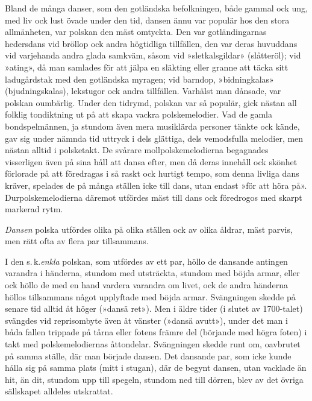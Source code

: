 \pagestyle{empty}
\fancyhfoffset[E,O]{0pt}
\addtolength{\skip\footins}{\baselineskip}
{
\setlength{\parindent}{1.5em}


Bland de många danser, som den gotländska befolkningen,
både gammal ock ung, med liv ock lust övade under den
tid, dansen ännu var populär hos den stora allmänheten, var
polskan den mäst omtyckta. Den var gotländingarnas hedersdans vid bröllop ock andra högtidliga tillfällen, den var deras huvuddans vid varjehanda andra glada samkväm, såsom vid »sletkalsgildar» (slåtteröl); vid »ating», då man samlades för att jälpa en släkting eller granne att täcka sitt ladugårdstak med den gotländska myragen; vid barndop, »bidningkalas»
(bjudningskalas), lekstugor ock andra tillfällen. Varhälst man dånsade, var polskan oumbärlig. Under den tidrymd, polskan var så populär, gick nästan all folklig tondiktning ut på att skapa vackra polskemelodier. Vad de gamla bondspelmännen, ja stundom även mera musiklärda personer tänkte ock kände, gav sig under nämnda tid uttryck i dels glättiga, dels vemodsfulla melodier, men nästan alltid i \textemdash{} polsketakt. De svårare mollpolskemelodierna begagnades visserligen även på sina håll att dansa efter, men då deras innehåll ock skönhet förlorade på att föredragas i så raskt ock hurtigt tempo, som denna livliga dans kräver, spelades de på många ställen icke till
dans, utan endast »för att höra på». Durpolskemelodierna däremot utfördes mäst till dans ock föredrogos med skarpt markerad rytm.

\textit{Dansen} polska utfördes olika på olika ställen ock av olika åldrar, mäst parvis, men rätt ofta av flera par tillsammans.

I den s.\,k.\@ \textit{enkla} polskan, som utfördes av ett par, höllo de dansande antingen varandra i händerna, stundom med 
utsträckta, %
stundom med böjda armar, eller ock höllo de med en hand vardera varandra om livet, ock de andra händerna höllos tillsammans något upplyftade med böjda armar. Svängningen skedde på senare tid alltid åt höger (»dansä ret»). Men i äldre tider (i slutet av 1700-talet) svängdes vid reprisombyte även åt vänster (»dansä avutt»), under det man i båda fallen trippade på tårna eller fotens främre del (börjande med högra foten) i takt med polskemelodiernas åttondelar. Svängningen skedde runt om, oavbrutet på samma ställe, där man började dansen. Det dansande par, som icke kunde hålla sig på samma plats (mitt i stugan), där de begynt dansen, utan vacklade än hit, än dit, stundom upp till spegeln, stundom ned till dörren, blev av det övriga sällskapet alldeles utskrattat.

}
